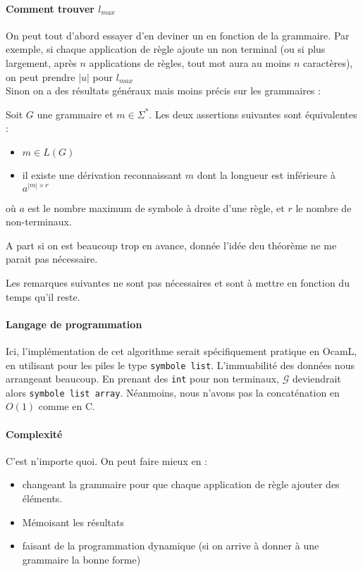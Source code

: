 \paragraph{Comment trouver $l_{max}$} On peut tout d'abord essayer d'en deviner un en fonction de la grammaire. Par exemple, si chaque application de règle ajoute un non terminal (ou si plus largement, après $n$ applications de règles, tout mot aura au moins $n$ caractères), on peut prendre $|u|$ pour $l_{max}$\\

Sinon on a des résultats généraux mais moins précis sur les grammaires :
\begin{theorem}
	Soit $G$ une grammaire et $m\in \Sigma^*$. Les deux assertions suivantes sont équivalentes :
	\begin{itemize}
		\item $m\in L(G)$ 
		\item il existe une dérivation reconnaissant $m$ dont la longueur est inférieure à $a^{|m|\times r}$
	\end{itemize}
	où $a$ est le nombre maximum de symbole à droite d'une règle, et $r$ le nombre de non-terminaux.
\end{theorem}

\begin{com}
	A part si on est beaucoup trop en avance, donnée l'idée deu théorème ne me parait pas nécessaire.
\end{com}

\begin{com}
	Les remarques suivantes ne sont pas nécessaires et sont à mettre en fonction du temps qu'il reste.
\end{com}

\paragraph{Langage de programmation} Ici, l'implémentation de cet algorithme serait spécifiquement pratique en OcamL, en utilisant pour les piles le type \texttt{symbole list}. L'immuabilité des données nous arrangeant beaucoup. En prenant des \texttt{int} pour non terminaux, $\mathcal G$ deviendrait alors \texttt{symbole list array}. Néanmoins, nous n'avons pas la concaténation en $O(1)$ comme en C.

\paragraph{Complexité} C'est n'importe quoi. On peut faire mieux en : \begin{itemize}
	\item changeant la grammaire pour que chaque application de règle ajouter des éléments.
	\item Mémoisant les résultats
	\item faisant de la programmation dynamique (si on arrive à donner à une grammaire la bonne forme)
\end{itemize}